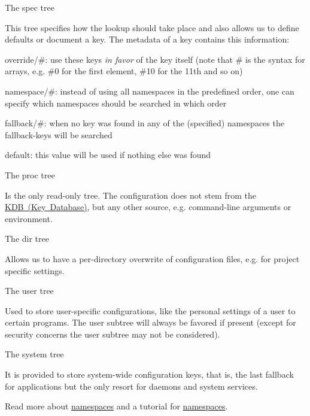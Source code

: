 \begin{DoxyItemize}
\item The {\ttfamily spec} tree

This tree specifies how the lookup should take place and also allows us to define defaults or document a key. The metadata of a key contains this information\+:
\begin{DoxyItemize}
\item {\ttfamily override/\#}\+: use these keys {\itshape in favor} of the key itself (note that {\ttfamily \#} is the syntax for arrays, e.\+g. {\ttfamily \#0} for the first element, {\ttfamily \#10} for the 11th and so on)
\item {\ttfamily namespace/\#}\+: instead of using all namespaces in the predefined order, one can specify which namespaces should be searched in which order
\item {\ttfamily fallback/\#}\+: when no key was found in any of the (specified) namespaces the {\ttfamily fallback}-\/keys will be searched
\item {\ttfamily default}\+: this value will be used if nothing else was found
\end{DoxyItemize}
\item The {\ttfamily proc} tree

Is the only read-\/only tree. The configuration does not stem from the \mbox{\hyperlink{group__kdb}{K\+DB (Key Database)}}, but any other source, e.\+g. command-\/line arguments or environment.
\item The {\ttfamily dir} tree

Allows us to have a per-\/directory overwrite of configuration files, e.\+g. for project specific settings.
\item The {\ttfamily user} tree

Used to store user-\/specific configurations, like the personal settings of a user to certain programs. The user subtree will always be favored if present (except for security concerns the user subtree may not be considered).
\item The {\ttfamily system} tree

It is provided to store system-\/wide configuration keys, that is, the last fallback for applications but the only resort for daemons and system services.
\end{DoxyItemize}

Read more about \mbox{\hyperlink{doc_help_elektra-namespaces_md}{namespaces}} and a tutorial for \mbox{\hyperlink{doc_tutorials_namespaces_md}{namespaces}}.

